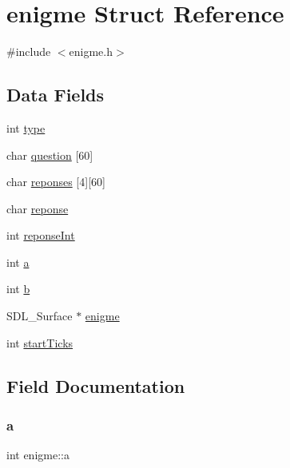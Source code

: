 \hypertarget{structenigme}{}\section{enigme Struct Reference}
\label{structenigme}


{\ttfamily \#include $<$enigme.\+h$>$}

\subsection*{Data Fields}
\begin{DoxyCompactItemize}
\item 
int \hyperlink{structenigme_a2dfaa436eec08235e9d171809c885625}{type}
\item 
char \hyperlink{structenigme_ac5f266cc0f0376564e4707b072e9ed5e}{question} \mbox{[}60\mbox{]}
\item 
char \hyperlink{structenigme_acbdf1b2afa5727b3e237f0930df1038c}{reponses} \mbox{[}4\mbox{]}\mbox{[}60\mbox{]}
\item 
char \hyperlink{structenigme_ac5068c8be72169b27a39df8e82577b0d}{reponse}
\item 
int \hyperlink{structenigme_ab0fa044155e2331723b3a74822ccb6b0}{reponse\+Int}
\item 
int \hyperlink{structenigme_adb2a42545d9e64a26691b8ce4dc5341a}{a}
\item 
int \hyperlink{structenigme_a62f32d690aa699e921c0e8921573491e}{b}
\item 
S\+D\+L\+\_\+\+Surface $\ast$ \hyperlink{structenigme_a8c865bdd8e1c473935c4fa79e386c3cc}{enigme}
\item 
int \hyperlink{structenigme_a1e1e6c58f33ffed48b4eda090889ca38}{start\+Ticks}
\end{DoxyCompactItemize}


\subsection{Field Documentation}
\mbox{\label{structenigme_adb2a42545d9e64a26691b8ce4dc5341a}} 
\subsubsection{\texorpdfstring{a}{a}}
{\footnotesize\ttfamily int enigme\+::a}

\mbox{\label{structenigme_a62f32d690aa699e921c0e8921573491e}} 
